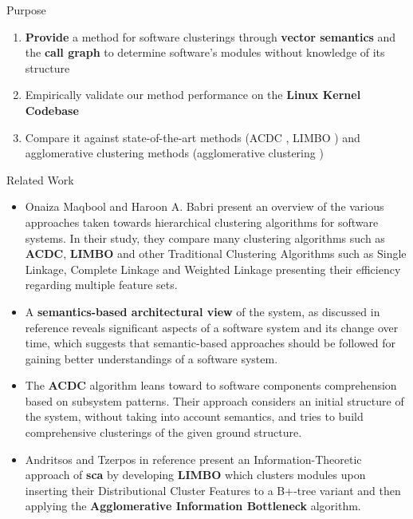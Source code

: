 \documentclass[final]{beamer}
\newlength{\colwidth}
\begin{document}
\begin{frame}[t]
\begin{columns}[t]
\begin{column}{\colwidth}
  \begin{alertblock}{Purpose}

    
\begin{enumerate}
    \item \textbf{Provide} a method for software clusterings through \textbf{vector semantics} and the \textbf{call graph} to determine software's modules without knowledge of its structure
    \item Empirically validate our method performance on the \textbf{Linux Kernel Codebase}

    \item Compare it against state-of-the-art methods (ACDC \cite{acdc}, LIMBO \cite{LIMBO}) and agglomerative clustering methods (agglomerative clustering \cite{average, complete, ward}) 
\end{enumerate}
    
  \end{alertblock}

\begin{block}{Related Work} 

\begin{itemize}
\justifying

\item Onaiza Maqbool and Haroon A. Babri \cite{maqbool_overview} present an
overview of the various approaches taken towards hierarchical clustering algorithms
for software systems. In their study, they compare many clustering algorithms
such as \textbf{ACDC}, \textbf{LIMBO} and other Traditional Clustering Algorithms such as Single
Linkage, Complete Linkage and Weighted Linkage presenting their efficiency regarding 
multiple feature sets. 

\item A \textbf{semantics-based architectural view} of the system, as discussed in reference
\cite{large_study} reveals significant aspects of a software system and its change over 
time, which suggests that semantic-based approaches should be followed for gaining better understandings of a software system. 

\item The \textbf{ACDC} algorithm leans toward to software components comprehension 
based on subsystem patterns. Their approach considers an initial structure of the system, 
without taking into account semantics, and tries to build comprehensive clusterings of the given ground structure. 

\item Andritsos and Tzerpos in reference \cite{LIMBO} present an Information-Theoretic 
approach of \textbf{sca} by developing \textbf{LIMBO} which clusters modules upon inserting their Distributional Cluster Features 
to a B+-tree variant and then applying the \textbf{Agglomerative Information Bottleneck} algorithm.
\end{itemize}


\end{block}
\end{column}
\end{columns}
\end{frame}
\end{document}

